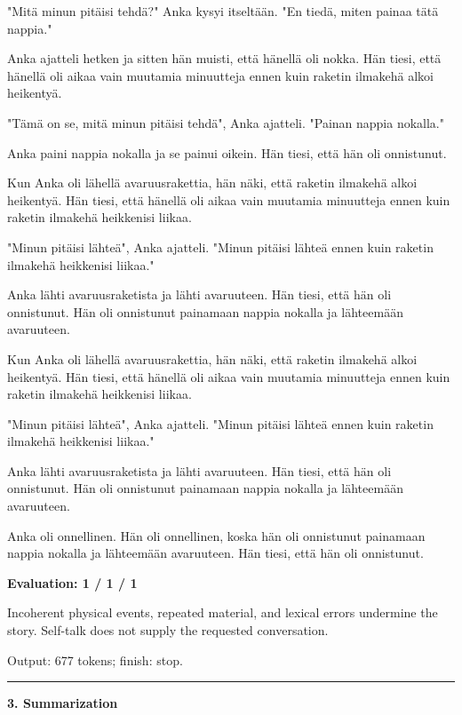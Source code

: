 \documentclass[10pt]{article}
\begin{document}
{\begin{minipage}{\textwidth}
\par\smallskip
"Mitä minun pitäisi tehdä?" Anka kysyi itseltään. "En tiedä, miten painaa tätä nappia."
\par\smallskip
Anka ajatteli hetken ja sitten hän muisti, että hänellä oli nokka. Hän tiesi, että hänellä oli aikaa vain muutamia minuutteja ennen kuin raketin ilmakehä alkoi heikentyä.
\par\smallskip
"Tämä on se, mitä minun pitäisi tehdä", Anka ajatteli. "Painan nappia nokalla."
\par\smallskip
Anka paini nappia nokalla ja se painui oikein. Hän tiesi, että hän oli onnistunut.
\par\smallskip
Kun Anka oli lähellä avaruusrakettia, hän näki, että raketin ilmakehä alkoi heikentyä. Hän tiesi, että hänellä oli aikaa vain muutamia minuutteja ennen kuin raketin ilmakehä heikkenisi liikaa.
\par\smallskip
"Minun pitäisi lähteä", Anka ajatteli. "Minun pitäisi lähteä ennen kuin raketin ilmakehä heikkenisi liikaa."
\par\smallskip
Anka lähti avaruusraketista ja lähti avaruuteen. Hän tiesi, että hän oli onnistunut. Hän oli onnistunut painamaan nappia nokalla ja lähteemään avaruuteen.
\par\smallskip
Kun Anka oli lähellä avaruusrakettia, hän näki, että raketin ilmakehä alkoi heikentyä. Hän tiesi, että hänellä oli aikaa vain muutamia minuutteja ennen kuin raketin ilmakehä heikkenisi liikaa.
\par\smallskip
"Minun pitäisi lähteä", Anka ajatteli. "Minun pitäisi lähteä ennen kuin raketin ilmakehä heikkenisi liikaa."
\par\smallskip
Anka lähti avaruusraketista ja lähti avaruuteen. Hän tiesi, että hän oli onnistunut. Hän oli onnistunut painamaan nappia nokalla ja lähteemään avaruuteen.
\par\smallskip
Anka oli onnellinen. Hän oli onnellinen, koska hän oli onnistunut painamaan nappia nokalla ja lähteemään avaruuteen. Hän tiesi, että hän oli onnistunut.\par\smallskip
\textbf{Evaluation: 1 / 1 / 1}\par Incoherent physical events, repeated material, and lexical errors undermine the story. Self-talk does not supply the requested conversation.
\par {\color{gray} Output: 677 tokens; finish: stop.}\par
\medskip\hrule\smallskip
{\bfseries 3. Summarization}\par\smallskip

\end{minipage}}
\end{document}
